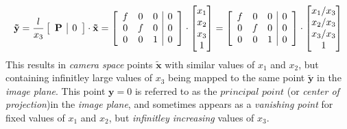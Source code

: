 \begin{equation*}
\begin{split}
\mathbf{\tilde{y}}
=
\frac{l}{x_3}\left[\begin{array}{c|c}\mathbf{P}&\vZero\end{array}\right]\cdot\mathbf{\tilde{x}}
=
\left[\begin{array}{ccc|c}
f & 0 & 0 & 0\\
0 & f & 0 & 0\\
0 & 0 & 1 & 0\\
\end{array}\right]
\cdot\begin{bmatrix}x_1\\x_2\\x_3\\1\end{bmatrix}
=
\left[\begin{array}{ccc|c}
f & 0 & 0 & 0\\
0 & f & 0 & 0\\
0 & 0 & 1 & 0\\
\end{array}\right]
\cdot\begin{bmatrix}x_1/x_3\\x_2/x_3\\x_3/x_3\\1\end{bmatrix}
\end{split}
\end{equation*}%
This results in \textit{camera space} points $\mathbf{\tilde{x}}$ with similar values of $x_1$ and $x_2$, but containing infinitley large values of $x_3$ being mapped to the same point $\mathbf{\tilde{y}}$ in the \textit{image plane}. This point $\mathbf{y}=0$ is referred to as the $\textit{principal point}$ (or \textit{center of projection})in the \textit{image plane}, and sometimes appears as a \textit{vanishing point} for fixed values of $x_1$ and $x_2$, but \textit{infinitley increasing} values of $x_3$.

